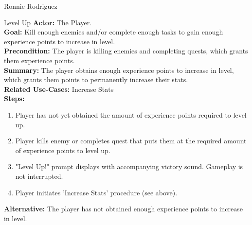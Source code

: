 \documentclass[12pt]{report}
\begin{document}
\begin{section}{Ronnie Rodriguez}
\begin{subsection}{Level Up}
\textbf{Actor:} The Player. \\
\textbf{Goal:} Kill enough enemies and/or complete enough tasks to gain enough experience points to increase in level. \\
\textbf{Precondition:} The player is killing enemies and completing quests, which grants them experience points. \\
\textbf{Summary:} The player obtains enough experience points to increase in level, which grants them points to permanently increase their stats. \\
\textbf{Related Use-Cases:} Increase Stats \\
\textbf{Steps:}
\begin{enumerate}
	\item Player has not yet obtained the amount of experience points required to level up.
	\item Player kills enemy or completes quest that puts them at the required amount of experience points to level up.
	\item "Level Up!" prompt displays with accompanying victory sound. Gameplay is not interrupted.
	\item Player initiates 'Increase Stats' procedure (see above).
\end{enumerate}
\textbf{Alternative:} The player has not obtained enough experience points to increase in level.
\end{subsection}


\end{section}
\end{document}

